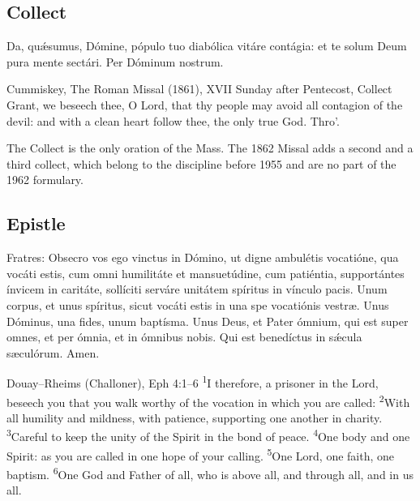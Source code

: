 \subsection{Collect}
\label{proper-collect}


\begin{latinproper}
Da, quǽsumus, Dómine, pópulo tuo diabólica vitáre contágia: et te solum Deum
pura mente sectári. Per Dóminum nostrum.
\end{latinproper}

\begin{englishwitness}{Cummiskey, The Roman Missal (1861), XVII Sunday after Pentecost, Collect}
Grant, we beseech thee, O Lord, that thy people may avoid all contagion of the
devil: and with a clean heart follow thee, the only true God. Thro'.
\end{englishwitness}

\noindent The Collect is the only oration of the Mass. The 1862 Missal adds a second and
a third collect, which belong to the discipline before 1955 and are no part of
the 1962 formulary.

\subsection{Epistle}
\label{proper-epistle}


\begin{latinproper}
Fratres: Obsecro vos ego vinctus in Dómino, ut digne ambulétis vocatióne, qua
vocáti estis, cum omni humilitáte et mansuetúdine, cum patiéntia,
supportántes ínvicem in caritáte, sollíciti serváre unitátem spíritus in
vínculo pacis. Unum corpus, et unus spíritus, sicut vocáti estis in una spe
vocatiónis vestræ. Unus Dóminus, una fides, unum baptísma. Unus Deus, et Pater
ómnium, qui est super omnes, et per ómnia, et in ómnibus nobis. Qui est
benedíctus in sǽcula sæculórum. Amen.
\end{latinproper}

\begin{englishwitness}{Douay--Rheims (Challoner), Eph 4:1--6}
\textsuperscript{1}I therefore, a prisoner in the Lord, beseech you that you
walk worthy of the vocation in which you are called: \textsuperscript{2}With
all humility and mildness, with patience, supporting one another in charity.
\textsuperscript{3}Careful to keep the unity of the Spirit in the bond of
peace. \textsuperscript{4}One body and one Spirit: as you are called in one
hope of your calling. \textsuperscript{5}One Lord, one faith, one baptism.
\textsuperscript{6}One God and Father of all, who is above all, and through
all, and in us all.
\end{englishwitness}

